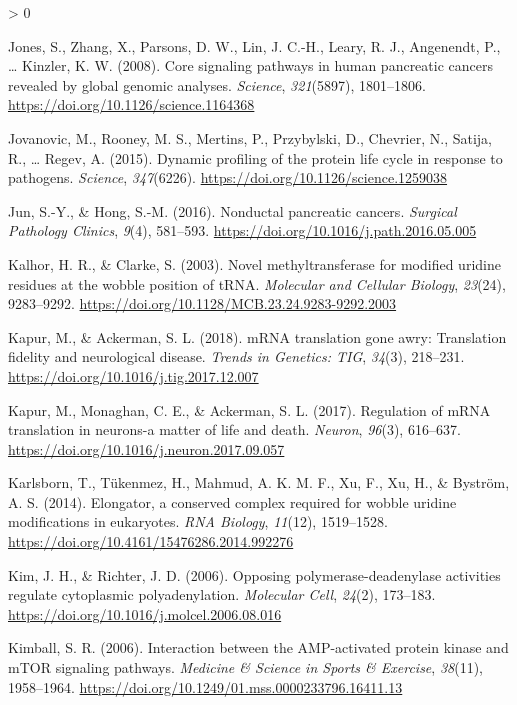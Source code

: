 \documentclass[
  12pt,
  openany]{book}
\newlength{\cslhangindent}
\newenvironment{CSLReferences}[2] %
 {%
  \setlength{\parindent}{0pt}
  \ifodd #1 \everypar{\setlength{\hangindent}{\cslhangindent}}\ignorespaces\fi
  \ifnum #2 > 0
  \setlength{\parskip}{#2\baselineskip}
  \fi
 }%
 {}
\begin{document}
\begin{CSLReferences}{1}{0}
\leavevmode\hypertarget{ref-Jones2008}{}%
Jones, S., Zhang, X., Parsons, D. W., Lin, J. C.-H., Leary, R. J., Angenendt, P., \ldots{} Kinzler, K. W. (2008). Core signaling pathways in human pancreatic cancers revealed by global genomic analyses. \emph{Science}, \emph{321}(5897), 1801--1806. \url{https://doi.org/10.1126/science.1164368}

\leavevmode\hypertarget{ref-Jovanovic2015}{}%
Jovanovic, M., Rooney, M. S., Mertins, P., Przybylski, D., Chevrier, N., Satija, R., \ldots{} Regev, A. (2015). Dynamic profiling of the protein life cycle in response to pathogens. \emph{Science}, \emph{347}(6226). \url{https://doi.org/10.1126/science.1259038}

\leavevmode\hypertarget{ref-Jun2016}{}%
Jun, S.-Y., \& Hong, S.-M. (2016). Nonductal pancreatic cancers. \emph{Surgical Pathology Clinics}, \emph{9}(4), 581--593. \url{https://doi.org/10.1016/j.path.2016.05.005}

\leavevmode\hypertarget{ref-Kalhor2003}{}%
Kalhor, H. R., \& Clarke, S. (2003). Novel methyltransferase for modified uridine residues at the wobble position of {tRNA}. \emph{Molecular and Cellular Biology}, \emph{23}(24), 9283--9292. \url{https://doi.org/10.1128/MCB.23.24.9283-9292.2003}

\leavevmode\hypertarget{ref-Kapur2018}{}%
Kapur, M., \& Ackerman, S. L. (2018). {mRNA} translation gone awry: Translation fidelity and neurological disease. \emph{Trends in Genetics: {TIG}}, \emph{34}(3), 218--231. \url{https://doi.org/10.1016/j.tig.2017.12.007}

\leavevmode\hypertarget{ref-Kapur2017}{}%
Kapur, M., Monaghan, C. E., \& Ackerman, S. L. (2017). Regulation of {mRNA} translation in neurons-a matter of life and death. \emph{Neuron}, \emph{96}(3), 616--637. \url{https://doi.org/10.1016/j.neuron.2017.09.057}

\leavevmode\hypertarget{ref-Karlsborn2014}{}%
Karlsborn, T., Tükenmez, H., Mahmud, A. K. M. F., Xu, F., Xu, H., \& Byström, A. S. (2014). Elongator, a conserved complex required for wobble uridine modifications in eukaryotes. \emph{{RNA} Biology}, \emph{11}(12), 1519--1528. \url{https://doi.org/10.4161/15476286.2014.992276}

\leavevmode\hypertarget{ref-Kim2006}{}%
Kim, J. H., \& Richter, J. D. (2006). Opposing polymerase-deadenylase activities regulate cytoplasmic polyadenylation. \emph{Molecular Cell}, \emph{24}(2), 173--183. \url{https://doi.org/10.1016/j.molcel.2006.08.016}

\leavevmode\hypertarget{ref-Kimball2006}{}%
Kimball, S. R. (2006). Interaction between the {AMP}-activated protein kinase and {mTOR} signaling pathways. \emph{Medicine \& Science in Sports \& Exercise}, \emph{38}(11), 1958--1964. \url{https://doi.org/10.1249/01.mss.0000233796.16411.13}


\end{CSLReferences}
\end{document}
